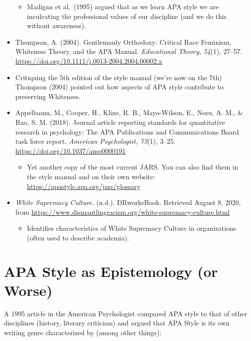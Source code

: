 \documentclass[
  11pt,
]{book}
\providecommand{\tightlist}{%
  \setlength{\itemsep}{0pt}\setlength{\parskip}{0pt}}
\begin{document}
\begin{itemize}
  \begin{itemize}
  \tightlist
  \item
    Madigan et al.~(1995) argued that as we learn APA style we are inculcating the professional values of our discipline (and we do this without awareness).
  \end{itemize}
\item
  Thompson, A. (2004). Gentlemanly Orthodoxy: Critical Race Feminism, Whiteness Theory, and the APA Manual. \emph{Educational Theory, 54}(1), 27--57. \url{https://doi.org/10.1111/j.0013-2004.2004.00002.x}
\item
  Critiquing the 5th edition of the style manual (we're now on the 7th) Thompson (2004) pointed out how aspects of APA style contribute to preserving Whiteness.
\item
  Appelbaum, M., Cooper, H., Kline, R. B., Mayo-Wilson, E., Nezu, A. M., \& Rao, S. M. (2018). Journal article reporting standards for quantitative research in psychology: The APA Publications and Communications Board task force report. \emph{American Psychologist, 73}(1), 3--25. \url{https://doi.org/10.1037/amp0000191}

  \begin{itemize}
  \tightlist
  \item
    Yet another copy of the most current JARS. You can also find them in the style manual and on their own website: \url{https://apastyle.apa.org/jars/glossary}
  \end{itemize}
\item
  \emph{White Supremacy Culture.} (n.d.). DRworksBook. Retrieved August 8, 2020, from \url{https://www.dismantlingracism.org/white-supremacy-culture.html}

  \begin{itemize}
  \tightlist
  \item
    Identifies characteristics of White Supremacy Culture in organizations (often used to describe academia).
  \end{itemize}
\end{itemize}

\hypertarget{apa-style-as-epistemology-or-worse}{%
\section{APA Style as Epistemology (or Worse)}\label{apa-style-as-epistemology-or-worse}}

A 1995 article \citep{madigan_language_1995} in the American Psychologist compared APA style to that of other disciplines (history, literary criticism) and argued that APA Style is its own writing genre characterized by (among other things):
\end{document}
